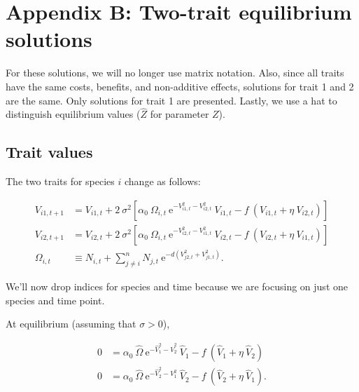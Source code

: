 \section*{Appendix B: Two-trait equilibrium solutions}

\renewcommand{\thefigure}{B\arabic{figure}}
\renewcommand{\theequation}{B\arabic{equation}}
\renewcommand{\thetable}{B\arabic{table}}
\setcounter{equation}{0}
\setcounter{figure}{0}
\setcounter{table}{0}


For these solutions, we will no longer use matrix notation.
Also, since all traits have the same costs, benefits, and
non-additive effects, solutions for trait 1 and 2 are the same.
Only solutions for trait 1 are presented.
Lastly, we use a hat to distinguish equilibrium values
($\hat{Z}$ for parameter $Z$).



\subsection*{Trait values}

The two traits for species $i$ change as follows:

\begin{equation*}
\begin{split}
    V_{i1,t+1} &= V_{i1,t} + 2 ~ \sigma^2
    \left[
        \alpha_0 ~ \Omega_{i,t} ~
            \textrm{e}^{-V_{i1,t}^2 - V_{i2,t}^2} ~ V_{i1,t}
        - f ~ ( V_{i1,t} + \eta ~ V_{i2,t} )
    \right] \\
    V_{i2,t+1} &= V_{i2,t} + 2 ~ \sigma^2
    \left[
        \alpha_0 ~ \Omega_{i,t} ~
            \textrm{e}^{-V_{i2,t}^2 - V_{i1,t}^2} ~ V_{i2,t}
        - f ~ ( V_{i2,t} + \eta ~ V_{i1,t} )
    \right] \\
    \Omega_{i,t} &\equiv N_{i,t} +
        \sum_{j \ne i}^{n}{ N_{j,t} ~ \textrm{e}^{
                -d (V_{j2,t}^2 + V_{j1,t}^2) } }
    \textrm{.}
\end{split}
\end{equation*}


We'll now drop indices for species and time because we are
focusing on just one species and time point.


At equilibrium (assuming that $\sigma > 0$),

\begin{equation}
\begin{split}
    0 &= \alpha_0 ~ \hat{\Omega} ~
            \textrm{e}^{-\hat{V}_{1}^2 - \hat{V}_{2}^2} ~ \hat{V}_{1}
        - f ~ ( \hat{V}_{1} + \eta ~ \hat{V}_{2} ) \\
    0 &=
        \alpha_0 ~ \hat{\Omega} ~
            \textrm{e}^{-\hat{V}_{2}^2 - V_{1}^2} ~ \hat{V}_{2}
        - f ~ ( \hat{V}_{2} + \eta ~ \hat{V}_{1} )
    \textrm{.}
\end{split}
\label{eq:two-traits-V-eq1}
\end{equation}


